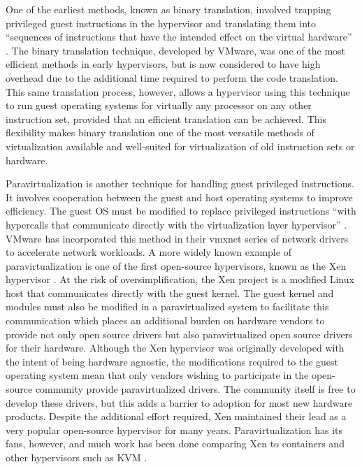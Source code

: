 One of the earliest methods, known as binary translation, involved trapping privileged guest instructions in the hypervisor and translating them into ``sequences of instructions that have the intended effect on the virtual hardware'' \autocite{vmwareVT}.
The binary translation technique, developed by VMware, was one of the most efficient methods in early hypervisors, but is now considered to have high overhead due to the additional time required to perform the code translation.
This same translation process, however, allows a hypervisor using this technique to run guest operating systems for virtually any processor on any other instruction set, provided that an efficient translation can be achieved.
This flexibility makes binary translation one of the most versatile methods of virtualization available and well-suited for virtualization of old instruction sets or hardware.

Paravirtualization is another technique for handling guest privileged instructions.
It involves cooperation between the guest and host operating systems to improve efficiency.
The guest OS must be modified to replace privileged instructions ``with hypercalls that communicate directly with the virtualization layer hypervisor'' \autocite{vmwareVT}.
VMware has incorporated this method in their vmxnet series of network drivers to accelerate network workloads.
A more widely known example of paravirtualization is one of the first open-source hypervisors, known as the Xen hypervisor \autocite{_barham_1}.
At the risk of oversimplification, the Xen project is a modified Linux host that communicates directly with the guest kernel.
The guest kernel and modules must also be modified in a paravirtualized system to facilitate this communication which places an additional burden on hardware vendors to provide not only open source drivers but also paravirtualized open source drivers for their hardware.
Although the Xen hypervisor was originally developed with the intent of being hardware agnostic, the modifications required to the guest operating system mean that only vendors wishing to participate in the open-source community provide paravirtualized drivers.
The community itself is free to develop these drivers, but this adds a barrier to adoption for most new hardware products.
Despite the additional effort required, Xen maintained their lead as a very popular open-source hypervisor for many years.
Paravirtualization has its fans, however, and much work has been done comparing Xen to containers and other hypervisors such as KVM \autocite{_felter_1, _younge_1, wangAmazon2010, _che_1, _scheepers_1, wangAllocation2007, rathore2013kvm}.

